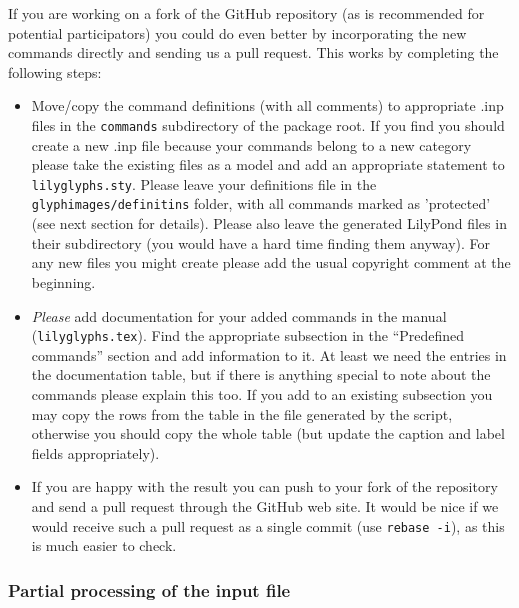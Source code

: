 \documentclass{article}
\begin{document}
If you are working on a fork of the GitHub repository (as is recommended for potential participators) you could do even better by incorporating the new commands directly and sending us a pull request.
This works by completing the following steps:
\begin{itemize}
\item Move/copy the command definitions (with all comments) to appropriate .inp files in the \texttt{commands} subdirectory of the package root.
If you find you should create a new .inp file because your commands belong to a new category please take the existing files as a model and add an appropriate  statement to \texttt{lilyglyphs.sty}.
Please leave your definitions file in the \texttt{glyphimages/definitins} folder, with all commands marked as 'protected' (see next section for details).
Please also leave the generated LilyPond files in their subdirectory (you would have a hard time finding them anyway).
For any new files you might create please add the usual copyright comment at the beginning.
\item \emph{Please} add documentation for your added commands in the manual (\texttt{lilyglyphs.tex}).
Find the appropriate subsection in the “Predefined commands” section and add information to it.
At least we need the entries in the documentation table, but if there is anything special to note about the commands please explain this too.
If you add to an existing subsection you may copy the rows from the table in the file generated by the script, otherwise you should copy the whole table (but update the caption and label fields appropriately).
\item If you are happy with the result you can push to your fork of the repository and send a pull request through the GitHub web site.
It would be nice if we would receive such a pull request as a single commit (use \texttt{rebase -i}), as this is much easier to check.
\end{itemize}


\subsubsection{Partial processing of the input file}
\label{subsubsec:BGI_partial_processing}
\end{document}
